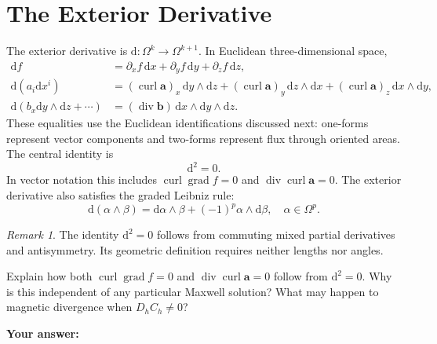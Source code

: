 \documentclass[11pt,openany]{book}
\numberwithin{equation}{chapter}
\theoremstyle{definition}
\theoremstyle{remark}
\newtheorem{remark}[theorem]{Remark}
\newcommand{\dd}{\mathrm d}
\newcommand{\grad}{\operatorname{grad}}
\newcommand{\Div}{\operatorname{div}}
\newcommand{\curl}{\operatorname{curl}}
\begin{document}
\section{The Exterior Derivative}
The exterior derivative is $\dd:\Omega^k\to\Omega^{k+1}$. In Euclidean three-dimensional space,
\begin{align}
\dd f&=\partial_x f\,\dd x+\partial_yf\,\dd y+\partial_zf\,\dd z,\\
\dd(a_i\dd x^i)&=(\curl\bm a)_x\,\dd y\wedge\dd z+(\curl\bm a)_y\,\dd z\wedge\dd x
 +(\curl\bm a)_z\,\dd x\wedge\dd y,\\
\dd(b_x\dd y\wedge\dd z+\cdots)&=(\Div\bm b)\,\dd x\wedge\dd y\wedge\dd z.
\end{align}
These equalities use the Euclidean identifications discussed next: one-forms represent vector components and two-forms represent flux through oriented areas. The central identity is
\begin{equation}\label{eq:d2zero}
\boxed{\dd^2=0.}
\end{equation}
In vector notation this includes $\curl\grad f=0$ and $\Div\curl\bm a=0$. The exterior derivative also satisfies the graded Leibniz rule:
\begin{equation}
\dd(\alpha\wedge\beta)=\dd\alpha\wedge\beta+(-1)^p\alpha\wedge\dd\beta,
\quad \alpha\in\Omega^p.
\end{equation}
\begin{remark}
The identity $\dd^2=0$ follows from commuting mixed partial derivatives and antisymmetry. Its geometric definition requires neither lengths nor angles.
\end{remark}

\begin{studentinput}
Explain how both $\curl\grad f=0$ and $\Div\curl\bm a=0$ follow from $\dd^2=0$. Why is this independent of any particular Maxwell solution? What may happen to magnetic divergence when $D_hC_h\ne0$?

\textbf{Your answer:}\vspace{2cm}
\end{studentinput}
\end{document}
